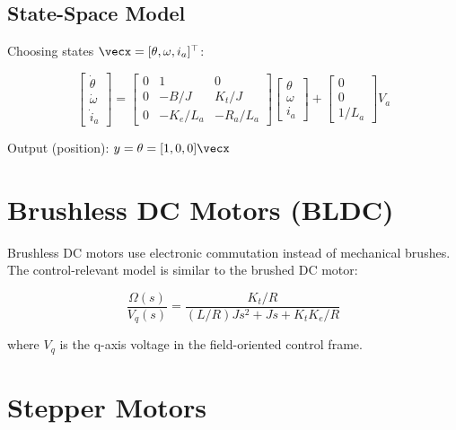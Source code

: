 \subsection{State-Space Model}

Choosing states $\vecx = [\theta, \omega, i_a]^\top$:

\begin{equation}
\begin{bmatrix} \dot{\theta} \\ \dot{\omega} \\ \dot{i}_a \end{bmatrix} =
\begin{bmatrix}
0 & 1 & 0 \\
0 & -B/J & K_t/J \\
0 & -K_e/L_a & -R_a/L_a
\end{bmatrix}
\begin{bmatrix} \theta \\ \omega \\ i_a \end{bmatrix} +
\begin{bmatrix} 0 \\ 0 \\ 1/L_a \end{bmatrix} V_a
\end{equation}

Output (position): $y = \theta = [1, 0, 0]\vecx$

\section{Brushless DC Motors (BLDC)}
\label{sec:bldc}

Brushless DC motors use electronic commutation instead of mechanical brushes. The control-relevant model is similar to the brushed DC motor:

\begin{equation}
\frac{\Omega(s)}{V_q(s)} = \frac{K_t/R}{(L/R)Js^2 + Js + K_t K_e/R}
\end{equation}

where $V_q$ is the q-axis voltage in the field-oriented control frame.

\section{Stepper Motors}
\label{sec:stepper}

